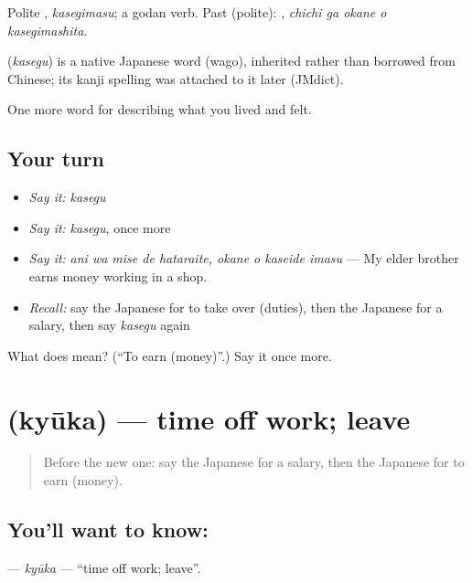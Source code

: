 Polite \textbf{}, \emph{kasegimasu}; a godan verb. Past (polite): \textbf{  }, \emph{chichi ga okane o kasegimashita}.

\begin{cousinweb}
\textbf{} (\emph{kasegu}) is a native Japanese word (wago), inherited rather than borrowed from Chinese; its kanji spelling was attached to it later (JMdict).
\end{cousinweb}

\begin{grammarlens}[title={What you've built}]
One more word for describing what you lived and felt.
\end{grammarlens}

\subsection*{Your turn}
\begin{itemize}
\raggedright
  \item \emph{Say it:} \emph{kasegu}
  \item \emph{Say it:} \emph{kasegu}, once more
  \item \emph{Say it:} \emph{ani wa mise de hataraite, okane o kaseide imasu} — My elder brother earns money working in a shop.
  \item \emph{Recall:} say the Japanese for to take over (duties), then the Japanese for a salary, then say \emph{kasegu} again
\end{itemize}

\begin{tcolorbox}[breakable,colback=teal!4,colframe=teal!35!black,title={Before you move on}]
What does  mean? (\textquotedblleft{}To earn (money)\textquotedblright{}.) Say it once more.
\end{tcolorbox}
\section[\texorpdfstring{\ja{きゅうか} (kyūka)}{きゅうか (kyūka)}]{ (kyūka) — time off work; leave}

\label{lesson:JA-C456-kyuuka}



\begin{quote}
Before the new one: say the Japanese for a salary, then the Japanese for to earn (money).
\end{quote}

\subsection*{You'll want to know: }
\textbf{} — \emph{kyūka} — \textquotedblleft{}time off work; leave\textquotedblright{}.

